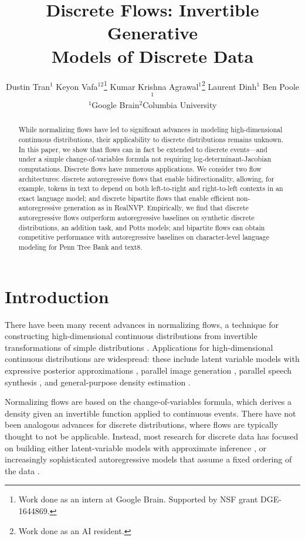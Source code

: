 \documentclass{article}
\title{Discrete Flows: Invertible Generative \\ Models of Discrete Data}
\author{Dustin Tran$^1$\quad
Keyon Vafa$^{1 2}$\thanks{Work done as an intern at Google Brain. Supported by NSF grant DGE-1644869.}\quad
Kumar Krishna Agrawal$^1$\thanks{Work done as an AI resident.}\quad
Laurent Dinh$^1$\quad
Ben Poole$^1$ \\
$^1$Google Brain\quad $^2$Columbia University
}
\begin{document}
\maketitle


\begin{abstract}
While normalizing flows have led to significant advances in modeling high-dimensional continuous distributions, their applicability to discrete distributions remains unknown. In this paper, we show that flows can in fact be extended to discrete events---and under a simple change-of-variables formula not requiring log-determinant-Jacobian computations. Discrete flows have numerous applications. We consider two flow architectures: discrete autoregressive flows that enable bidirectionality, allowing, for example, tokens in text to depend on both left-to-right and right-to-left contexts in an exact language model; and discrete bipartite flows that enable efficient non-autoregressive generation as in RealNVP. Empirically, we find that discrete autoregressive flows outperform autoregressive baselines on synthetic discrete distributions, an addition task, and Potts models; and bipartite flows can obtain competitive performance with autoregressive baselines on character-level language modeling for Penn Tree Bank and text8.
\end{abstract}

\vspace{-1ex}
\section{Introduction}
\label{sec:introduction}
\vspace{-1ex}

There have been many recent advances in normalizing flows, a technique for constructing high-dimensional continuous distributions from invertible transformations of simple distributions
\citep{rezende2015variational,tabak2013family,rippel2013high}. Applications for high-dimensional continuous distributions are widespread: these include latent variable models with expressive posterior approximations \citep{rezende2015variational,ranganath2016hierarchical,kingma2016improved}, parallel image generation \citep{dinh2017density,kingma2018glow}, parallel speech synthesis \citep{oord2017parallel,ping2018clarinet,prenger2018waveglow},
and general-purpose density estimation \citep{papamakarios2017masked}.


Normalizing flows are based on the change-of-variables formula, which derives a density given an invertible function applied to continuous events. There have not been analogous advances for discrete distributions, where flows are typically thought to not be applicable. Instead, most research for discrete data has focused on building either latent-variable models with approximate inference \citep{bowman2015generating}, or increasingly sophisticated autoregressive models that assume a fixed ordering of the data \citep{bengio2003neural,vaswani2017attention}.
\end{document}
